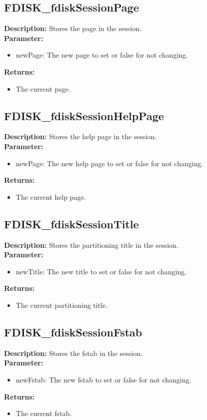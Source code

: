 \subsection{FDISK\_fdiskSessionPage}
\textbf{Description:} Stores the page in the session.\\
\textbf{Parameter:}
\begin{itemize}
\item newPage: The new page to set or false for not changing.
\end{itemize}
\textbf{Returns:}
\begin{itemize}
\item The current page.
\end{itemize}

\subsection{FDISK\_fdiskSessionHelpPage}
\textbf{Description:} Stores the help page in the session.\\
\textbf{Parameter:}
\begin{itemize}
\item newPage: The new help page to set or false for not changing.
\end{itemize}
\textbf{Returns:}
\begin{itemize}
\item The current help page.
\end{itemize}

\subsection{FDISK\_fdiskSessionTitle}
\textbf{Description:} Stores the partitioning title in the session.\\
\textbf{Parameter:}
\begin{itemize}
\item newTitle: The new title to set or false for not changing.
\end{itemize}
\textbf{Returns:}
\begin{itemize}
\item The current partitioning title.
\end{itemize}

\subsection{FDISK\_fdiskSessionFstab}
\textbf{Description:} Stores the fstab in the session.\\
\textbf{Parameter:}
\begin{itemize}
\item newFstab: The new fstab to set or false for not changing.
\end{itemize}
\textbf{Returns:}
\begin{itemize}
\item The current fstab.
\end{itemize}

